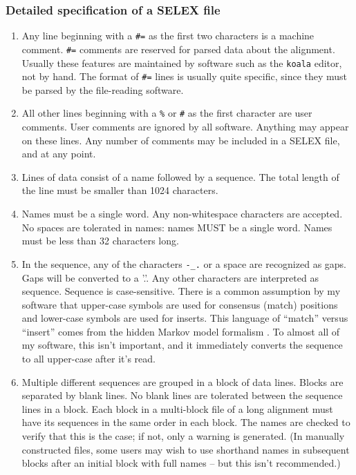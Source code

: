 \subsubsection {Detailed specification of a SELEX file}

\begin{enumerate}
\item
Any line beginning with a \verb+#=+ as the first two characters is a
machine comment.  \verb+#=+ comments are reserved for parsed data
about the alignment. Usually these features are maintained by software
such as the {\tt koala} editor, not by hand. The format of \verb+#=+
lines is usually quite specific, since they must be parsed by the
file-reading software.

\item
All other lines beginning with a \verb+%+ or \verb+#+ as the first
character are user comments.  User comments are ignored by all
software. Anything may appear on these lines. Any number of comments
may be included in a SELEX file, and at any point.

\item
Lines of data consist of a name followed by a sequence. The total
length of the line must be smaller than 1024 characters.

\item
Names must be a single word. Any non-whitespace characters are
accepted.  No spaces are tolerated in names: names MUST be a
single word. Names must be less than 32 characters long.

\item In the sequence, any of the characters \verb+-_.+ or a space are
recognized as gaps. Gaps will be converted to a '.'. Any other
characters are interpreted as sequence.  Sequence is
case-sensitive. There is a common assumption by my software that
upper-case symbols are used for consensus (match) positions and
lower-case symbols are used for inserts. This language of ``match''
versus ``insert'' comes from the hidden Markov model formalism
\cite{Krogh94}. To almost all of my software, this isn't important,
and it immediately converts the sequence to all upper-case after it's
read.

\item
Multiple different sequences are grouped in a block of data lines.
Blocks are separated by blank lines. No blank lines are tolerated
between the sequence lines in a block. Each block in a multi-block
file of a long alignment must have its sequences in the same order in
each block. The names are checked to verify that this is the case; if
not, only a warning is generated. (In manually constructed files, some
users may wish to use shorthand names in subsequent blocks after an
initial block with full names -- but this isn't recommended.)
\end{enumerate}

